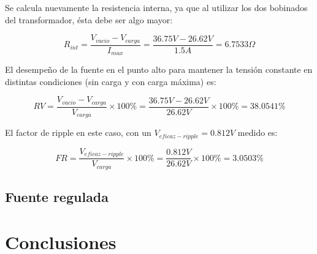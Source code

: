 \documentclass[chaptersright]{informeutn}
\begin{document}
        Se calcula nuevamente la resistencia interna, ya que al utilizar los dos bobinados del transformador, ésta
        debe ser algo mayor:

        \begin{equation}
            R_{int} = \frac{V_{vacio} - V_{carga}}{I_{max}}= \frac{36.75V - 26.62V}{1.5A} = 6.7533\Omega
        \end{equation}

        El desempeño de la fuente en el punto alto para mantener la tensión constante en distintas condiciones (sin carga
        y con carga máxima) es:

        \begin{equation}
            RV = \frac{V_{vacio} -V_{carga}}{V_{carga}} \times 100\% = \frac{36.75V-26.62V}{26.62V} \times 100\% = 38.0541\%
        \end{equation}

        El factor de ripple en este caso, con un $V_{eficaz-ripple}=0.812V$ medido es:

        \begin{equation}
            FR = \frac{V_{eficaz-ripple}}{V_{carga}} \times 100\% = \frac{0.812V}{26.62V} \times 100\% = 3.0503\%
        \end{equation}

        \section{Fuente regulada} 

  \chapter{Conclusiones}
\end{document}
